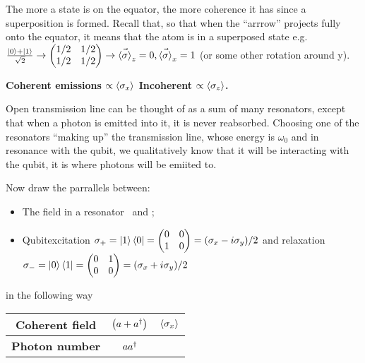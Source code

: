 \begin{enumerate}
	\noindent The more a state is on the equator, the more coherence it has since a superposition is formed. Recall that, so that when the ``arrrow'' projects fully onto the equator, it means that the atom is in a superposed state e.g. $ \frac{\Ket{0}+\Ket{1}}{\sqrt{2}} \rightarrow \begin{pmatrix}1/2&1/2\\1/2&1/2\end{pmatrix} \rightarrow \vec{\left\langle \sigma \right\rangle} _z = 0, \vec{\left\langle \sigma \right\rangle} _x = 1$ (or some other rotation around y).
	
	\begin{center}
		\textbf{Coherent emissions $ \propto {\ensuremath{\left\langle \sigma_x \right\rangle}} $\newline
			Incoherent $ \propto{\ensuremath{\left\langle \sigma_z \right\rangle}}  $. \large}
	\end{center}
	
	
	
	
	Open transmission line can be thought of as a sum of many resonators, except that when a photon is emitted into it, it is never reabsorbed. Choosing one of the resonators ``making up'' the transmission line, whose energy is $ \omega_0 $ and in resonance with the qubit, we qualitatively know that it will be interacting with the qubit, it is where photons will be emiited to.
	
	Now draw the parrallels between:
	
	\begin{itemize}
		\item The field in a resonator \hfill \ia\ and \iadagger;
		\item Qubit\hfill excitation $ \sigma_{+} = \ket{1}\bra{0} = \begin{pmatrix}0&0\\1&0\end{pmatrix} = (\sigma_x-i\sigma_y)/2$ and relaxation $ \sigma_{-} = \ket{0}\bra{1} = \begin{pmatrix}0&1\\0&0\end{pmatrix} = (\sigma_x+i\sigma_y)/2$
		
	\end{itemize}
	in the following way
	
	\begin{center}
		\begin{tabular}{|c|c|c|}
			\hline 
			\textbf{Coherent field} & $ \big(a + a^{\dagger}\big) $ & $ {\left\langle \sigma_x \right\rangle}  $ \\ 
			\hline 
			\textbf{Photon number} & $ aa^{\dagger} $& \isigmaz \\ 
			\hline 
		\end{tabular} 
	\end{center}
	

\end{enumerate}
